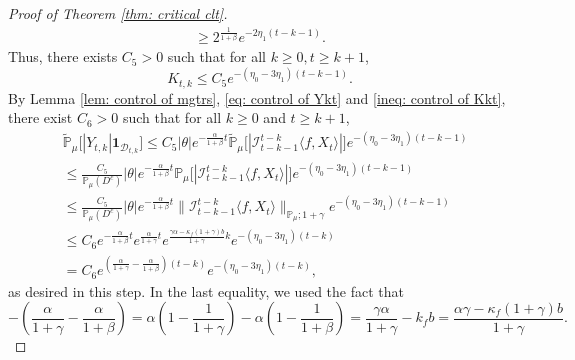 \documentclass[12pt,a4paper]{amsart}
\theoremstyle{plain}
\theoremstyle{definition}
\numberwithin{equation}{section}
\begin{document}
\begin{proof}[Proof of Theorem \ref{thm: critical clt}]
\begin{align}
    \geq 2^{\frac{1}{1+\beta}} e^{-2\eta_1(t-k-1)}.
\end{align}
    Thus, there exists  $C_5> 0$ such that for all $k \geq 0, t\geq k+1$,
\begin{equation}
\label{ineq: control of Kkt}
     K_{t,k}
     \leq C_5 e^{-(\eta_0 - 3\eta_1)(t-k-1)}.
\end{equation}
    By Lemma \ref{lem: control of mgtrs}, \eqref{eq: control of Ykt} and \eqref{ineq: control of Kkt},
    there exist $C_6>0$ such that for all $k\geq 0$ and $t\geq k+1$,
\begin{align}
\label{eq: Y in D}
    &\mathbb{\widetilde{P}}_{\mu}\big[|Y_{t,k}|\mathbf{1}_{\mathcal{D}_{t,k}}\big]
    \leq C_5|\theta|e^{-\frac{\alpha}{1+\beta}t}\mathbb{\widetilde{P}}_{\mu}\big[|\mathcal{I}_{t-k-1}^{t-k}\langle f,X_t\rangle|\big]e^{-(\eta_0 - 3\eta_1)(t-k-1)}
    \\&\leq \frac{C_5}{\mathbb{P}_{\mu}(D^c)}|\theta|e^{-\frac{\alpha}{1+\beta}t}\mathbb{P}_{\mu}\big[|\mathcal{I}_{t-k-1}^{t-k}\langle f,X_t\rangle|\big]e^{-(\eta_0 - 3\eta_1)(t-k-1)}
    \\&\leq \frac{C_5}{\mathbb{P}_{\mu}(D^c)}|\theta|e^{-\frac{\alpha}{1+\beta}t}\|\mathcal{I}_{t-k-1}^{t-k}\langle f,X_t\rangle\|_{\mathbb P_\mu; 1+\gamma} e^{-(\eta_0 - 3\eta_1)(t-k - 1)}
    \\&\leq C_6 e^{-\frac{\alpha}{1+\beta}t}e^{\frac{\alpha}{1+\gamma}t}e^{\frac{\gamma \alpha-\kappa_f(1+\gamma)b}{1+\gamma}k}e^{-(\eta_0 - 3\eta_1)(t-k)}
    \\&= C_6 e^{(\frac{\alpha}{1+\gamma}-\frac{\alpha}{1+\beta})(t-k)}e^{-(\eta_0 - 3\eta_1)(t-k)},
\end{align}
    as desired in this step.
    In the last equality, we used the fact that
\[
    -(\frac{\alpha}{1+\gamma}-\frac{\alpha}{1+\beta})
    = \alpha(1-\frac{1}{1+\gamma}) - \alpha(1-\frac{1}{1+\beta})
    = \frac{\gamma \alpha}{1+\gamma} - k_f b
    =\frac{\alpha \gamma-\kappa_f(1+\gamma)b}{1+\gamma}.
\]


\end{proof}
\end{document}
